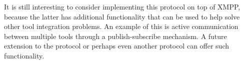 \documentclass{article}
\begin{document}
   It is still interesting to consider implementing this protocol on top of
   XMPP, because the latter has additional functionality that can be used to
   help solve other tool integration problems. An example of this is active
   communication between multiple tools through a publish-subscribe mechanism.
   A future extension to the protocol or perhaps even another protocol can
   offer such functionality.

  \enlargethispage*{4pt}
  
\end{document}
